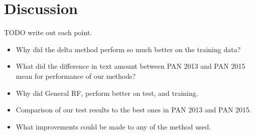 \section{Discussion}
TODO write out each point.

\begin{itemize}
    \item Why did the delta method perform so much better on the training data?
    \item What did the difference in text amount between PAN 2013 and PAN 2015
        mean for performance of our methods?
    \item Why did General RF, perform better on test, and training.
    \item Comparison of our test results to the best ones in PAN 2013 and PAN
        2015.
    \item What improvements could be made to any of the method used.
\end{itemize}
